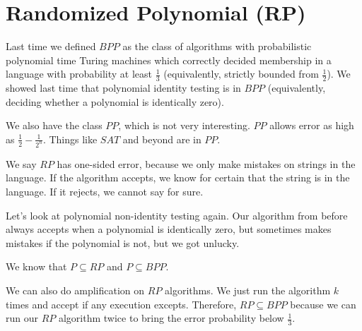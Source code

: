 





\section*{Randomized Polynomial (RP)}

Last time we defined $BPP$ as the class of algorithms with probabilistic polynomial time Turing machines which correctly decided membership in a language with probability at least $\frac{1}{3}$ (equivalently, strictly bounded from $\frac{1}{2}$).  We showed last time that polynomial identity testing is in $BPP$ (equivalently, deciding whether a polynomial is identically zero).


We also have the class $PP$, which is not very interesting.  $PP$ allows error as high as $\frac{1}{2}-\frac{1}{2^n}$.  Things like $SAT$ and beyond are in $PP$.


We say $RP$ has one-sided error, because we only make mistakes on strings in the language.  If the algorithm accepts, we know for certain that the string is in the language.  If it rejects, we cannot say for sure.

Let's look at polynomial non-identity testing again.  Our algorithm from before always accepts when a polynomial is identically zero, but sometimes makes mistakes if the polynomial is not, but we got unlucky.

We know that $P\subseteq RP$ and $P\subseteq BPP$.  

We can also do amplification on $RP$ algorithms.  We just run the algorithm $k$ times and accept if any execution excepts.  Therefore, $RP\subseteq BPP$ because we can run our $RP$ algorithm twice to bring the error probability below $\frac{1}{3}$.  

